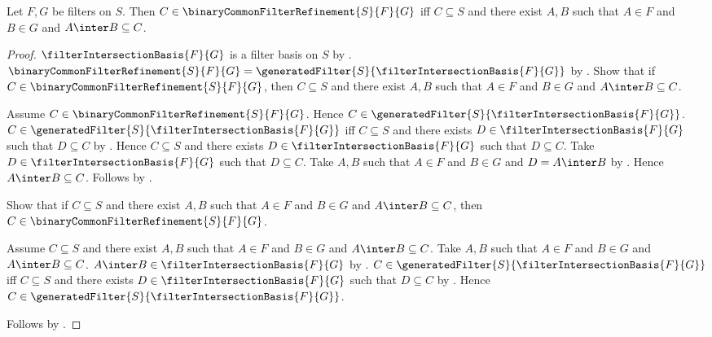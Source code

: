 \begin{theorem}\label{binary_common_filter_refinement_iff}
    Let $F,G$ be filters on $S$.
    Then $C\in\binaryCommonFilterRefinement{S}{F}{G}$ iff
        $C\subseteq S$ and there exist $A,B$ such that $A\in F$ and
        $B\in G$ and $A\inter B\subseteq C$.
\end{theorem}
\begin{proof}
    $\filterIntersectionBasis{F}{G}$ is a filter basis on $S$ by
        .
    $\binaryCommonFilterRefinement{S}{F}{G}
        =\generatedFilter{S}{\filterIntersectionBasis{F}{G}}$ by
        .
    Show that if $C\in\binaryCommonFilterRefinement{S}{F}{G}$, then
        $C\subseteq S$ and there exist $A,B$ such that $A\in F$ and
        $B\in G$ and $A\inter B\subseteq C$.
    \begin{subproof}
        Assume $C\in\binaryCommonFilterRefinement{S}{F}{G}$.
        Hence $C\in\generatedFilter{S}{\filterIntersectionBasis{F}{G}}$.
        $C\in\generatedFilter{S}{\filterIntersectionBasis{F}{G}}$ iff
            $C\subseteq S$ and there exists
            $D\in\filterIntersectionBasis{F}{G}$ such that $D\subseteq C$
            by .
        Hence $C\subseteq S$ and there exists
            $D\in\filterIntersectionBasis{F}{G}$ such that $D\subseteq C$.
        Take $D\in\filterIntersectionBasis{F}{G}$ such that
            $D\subseteq C$.
        Take $A,B$ such that $A\in F$ and $B\in G$ and
            $D=A\inter B$ by .
        Hence $A\inter B\subseteq C$.
        Follows by \auto.
    \end{subproof}
    Show that if $C\subseteq S$ and there exist $A,B$ such that $A\in F$
        and $B\in G$ and $A\inter B\subseteq C$, then
        $C\in\binaryCommonFilterRefinement{S}{F}{G}$.
    \begin{subproof}
        Assume $C\subseteq S$ and there exist $A,B$ such that $A\in F$
            and $B\in G$ and $A\inter B\subseteq C$.
        Take $A,B$ such that $A\in F$ and $B\in G$ and
            $A\inter B\subseteq C$.
        $A\inter B\in\filterIntersectionBasis{F}{G}$ by
            .
        $C\in\generatedFilter{S}{\filterIntersectionBasis{F}{G}}$ iff
            $C\subseteq S$ and there exists
            $D\in\filterIntersectionBasis{F}{G}$ such that $D\subseteq C$
            by .
        Hence $C\in\generatedFilter{S}{\filterIntersectionBasis{F}{G}}$.
    \end{subproof}
    Follows by \auto.
\end{proof}

